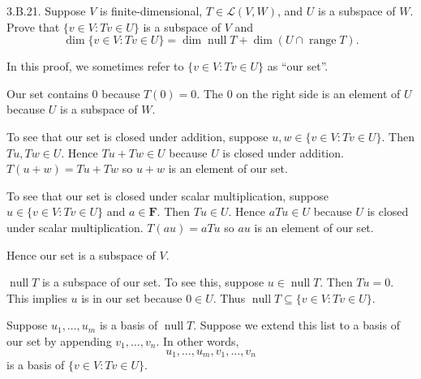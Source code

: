 \documentclass[a5paper]{article}
\begin{document}
\newcommand   \C           {\mathbf{C}}
\newcommand   \R           {\mathbf{R}}
\renewcommand \L           {\mathcal{L}}
\newcommand   \F           {\mathbf{F}}
\renewcommand \P           {\mathcal{P}}
\newcommand   \M           {\mathcal{M}}
\newcommand   \op          {\operatorname}

    3.B.21.
    Suppose $V$ is finite-dimensional, $T \in \L(V,W)$, and $U$ is a subspace of $W$.
    Prove that $\{v \in V : Tv \in U\}$ is a subspace of $V$ and
\begin{equation*}
        \op{dim}\{v \in V : Tv \in U\} = \op{dim}\op{null}T + \op{dim}(U \cap \op{range}T) .
\end{equation*}

    In this proof, we sometimes refer to $\{v \in V : Tv \in U\}$ as ``our set''.

    Our set contains 0 because $T(0)=0$.
    The 0 on the right side is an element of $U$ because $U$ is a subspace of $W$.
    
    To see that our set is closed under addition, suppose $u,w \in \{v \in V : Tv \in U\}$.
    Then $Tu,Tw \in U$.
    Hence $Tu+Tw \in U$ because $U$ is closed under addition.
    $T(u+w)=Tu+Tw$ so $u+w$ is an element of our set.

    To see that our set is closed under scalar multiplication, suppose $u \in \{v \in V : Tv \in U\}$ and $a \in \F$.
    Then $Tu \in U$.
    Hence $aTu \in U$ because $U$ is closed under scalar multiplication.
    $T(au)=aTu$ so $au$ is an element of our set.

    Hence our set is a subspace of $V$.

    $\op{null}T$ is a subspace of our set.
    To see this, suppose $u \in \op{null}T$.
    Then $Tu = 0$.
    This implies $u$ is in our set because $0 \in U$.
    Thus $\op{null}T \subseteq \{v \in V : Tv \in U\}$.

    Suppose $u_1,\dots,u_m$ is a basis of $\op{null}T$.
    Suppose we extend this list to a basis of our set by appending $v_1,\dots,v_n$.
    In other words,
\begin{equation*}
        u_1,\dots,u_m,v_1,\dots,v_n
\end{equation*}
    is a basis of $\{v \in V : Tv \in U\}$.
\end{document}
